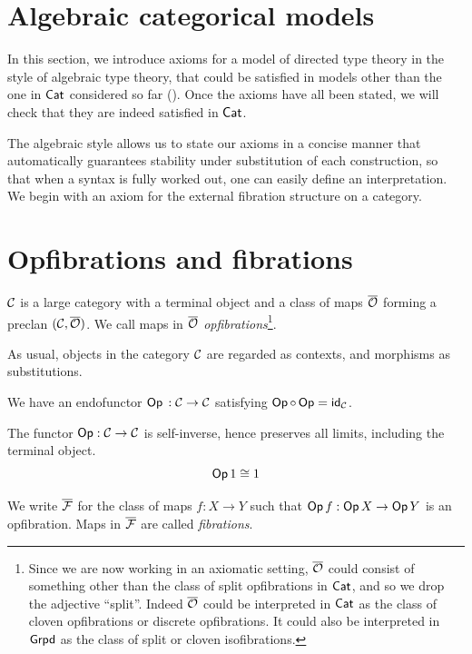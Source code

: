 \section{Algebraic categorical models}\label{sec:type-theoretic-axioms}

In this section,
we introduce axioms for a model of directed type theory
in the style of algebraic type theory,
that could be satisfied in models other than
the one in $\mathsf{Cat}$ considered so far ().
Once the axioms have all been stated,
we will check that they are indeed satisfied in $\mathsf{Cat}$.

The algebraic style allows us to state our axioms in a concise manner
that automatically guarantees stability under substitution of each construction,
so that when a syntax is fully worked out,
one can easily define an interpretation.
We begin with an axiom for the
external fibration structure on a category.

\section*{Opfibrations and fibrations} 
\begin{axiom}\label{ax:opfibration-preclan}
$\mathcal{C}$ is a large category with a terminal object and a
class of maps ${\overline{{\mathcal{O}}}}$ forming a preclan $(\mathcal{C},{\overline{{\mathcal{O}}}})$.
We call maps in ${\overline{{\mathcal{O}}}}$ \emph{opfibrations}\footnote{
  Since we are now working in an axiomatic setting,
  ${\overline{{\mathcal{O}}}}$ could consist of something other than the class of split opfibrations in $\mathsf{Cat}$,
  and so we drop the adjective ``split''.
  Indeed ${\overline{{\mathcal{O}}}}$ could be interpreted in $\mathsf{Cat}$
  as the class of cloven opfibrations
  or discrete opfibrations.
  It could also be interpreted in $\mathsf{Grpd}$
  as the class of split or cloven isofibrations.
}.
\end{axiom}

As usual, objects in the category $\mathcal{C}$ are regarded as contexts,
and morphisms as substitutions.

\begin{axiom}\label{ax:global-op}
  We have an endofunctor $\mathop{\mathsf{Op}}{} : \mathcal{C} \to \mathcal{C}$
  satisfying $\mathop{\mathsf{Op}} \circ \mathop{\mathsf{Op}} = \mathsf{id}_{\mathcal{C}}$.
\end{axiom}

The functor $\mathop{\mathsf{Op}} : \mathcal{C} \to \mathcal{C}$ is self-inverse,
hence preserves all limits, including the terminal object.
\[ \mathop{\mathsf{Op}}{1} \cong 1\]

\begin{definition}
  We write ${\overline{{\mathcal{F}}}}$ for the class of maps
  $f : X \to Y$ such that $\mathop{\mathsf{Op}}{f} : \mathop{\mathsf{Op}}{X} \to \mathop{\mathsf{Op}}{Y}$
  is an opfibration.
  Maps in ${\overline{{\mathcal{F}}}}$ are called \emph{fibrations}.
\end{definition}

